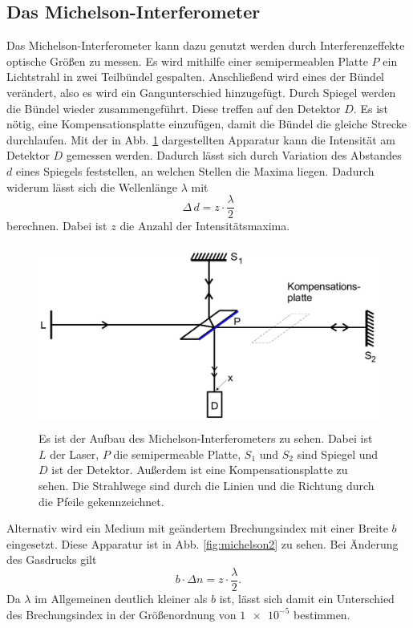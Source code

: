 \subsection{Das Michelson-Interferometer}
Das Michelson-Interferometer kann dazu genutzt werden durch Interferenzeffekte  optische Größen zu messen. 
Es wird mithilfe einer semipermeablen Platte $P$ ein Lichtstrahl in zwei Teilbündel 
gespalten. Anschließend wird eines der Bündel verändert, also es wird ein Gangunterschied hinzugefügt. Durch Spiegel werden die Bündel wieder zusammengeführt. Diese treffen auf den Detektor $D$.
Es ist nötig, eine Kompensationsplatte einzufügen, damit die Bündel die gleiche Strecke
durchlaufen.
Mit der in Abb. \ref{fig:michelson} dargestellten Apparatur kann die Intensität am 
Detektor $D$ gemessen werden. Dadurch lässt sich durch Variation des Abstandes $d$ eines Spiegels feststellen, an welchen Stellen die Maxima liegen. Dadurch widerum lässt sich die 
Wellenlänge $\lambda$ mit 
\begin{equation}
    \Delta \, d = z \cdot \frac{\lambda}{2}
    \label{eqn:lambda}
\end{equation}
berechnen. Dabei ist $z$ die Anzahl der Intensitätsmaxima.

\begin{figure}
    \centering
    \includegraphics[width=12cm, height=6cm]{build/michelson.png}
    \caption{Es ist der Aufbau des Michelson-Interferometers zu sehen. Dabei ist $L$ der Laser, $P$ die semipermeable Platte, $S_1$ und $S_2$ sind Spiegel und $D$ ist der Detektor. Außerdem ist eine Kompensationsplatte zu sehen. Die Strahlwege sind durch die Linien und die Richtung durch die Pfeile gekennzeichnet. \cite{V401}}
    \label{fig:michelson}
\end{figure}

\noindent Alternativ wird ein Medium mit geändertem Brechungsindex mit einer Breite $b$ eingesetzt.
Diese Apparatur ist in Abb. \ref{fig:michelson2} zu sehen.
Bei Änderung des Gasdrucks gilt
\begin{equation}
    b \cdot \Delta n = z \cdot \frac{\lambda}{2}.
    \label{eqn:deltan}
\end{equation}
Da $\lambda$ im Allgemeinen deutlich kleiner als $b$ ist, lässt sich damit ein 
Unterschied des Brechungsindex in der Größenordnung von $\num{1e-5}$ bestimmen.

